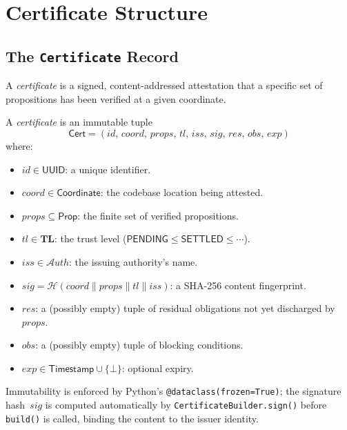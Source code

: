 \documentclass[11pt]{article}
\newcommand{\Cert}{\mathsf{Cert}}              %
\newcommand{\certid}{\mathit{id}}              %
\newcommand{\certcoord}{\mathit{coord}}        %
\newcommand{\certprops}{\mathit{props}}        %
\newcommand{\certtrust}{\mathit{tl}}           %
\newcommand{\certissuer}{\mathit{iss}}         %
\newcommand{\certsig}{\mathit{sig}}            %
\newcommand{\certresid}{\mathit{res}}          %
\newcommand{\certobstr}{\mathit{obs}}          %
\newcommand{\certexpiry}{\mathit{exp}}         %
\newcommand{\TL}{\mathbf{TL}}                  %
\newcommand{\Sigalg}{\mathcal{H}}              %
\newcommand{\Prop}{\mathsf{Prop}}              %
\newcommand{\AuthSet}{\mathcal{A}\!\mathit{uth}} %
\newcommand{\Pending}{\mathsf{PENDING}}
\newcommand{\Settled}{\mathsf{SETTLED}}
\begin{document}
\section{Certificate Structure}\label{sec:cert}

\subsection{The \texttt{Certificate} Record}

A \emph{certificate} is a signed, content-addressed attestation that a
specific set of propositions has been verified at a given coordinate.

\begin{definition}[Certificate]\label{def:cert}
A \emph{certificate} is an immutable tuple
\[
  \Cert = (\certid,\,\certcoord,\,\certprops,\,\certtrust,\,
           \certissuer,\,\certsig,\,\certresid,\,\certobstr,\,\certexpiry)
\]
where:
\begin{itemize}
  \item $\certid \in \mathsf{UUID}$: a unique identifier.
  \item $\certcoord \in \mathsf{Coordinate}$: the codebase location being attested.
  \item $\certprops \subseteq \Prop$: the finite set of verified propositions.
  \item $\certtrust \in \TL$: the trust level ($\Pending \le \Settled \le \cdots$).
  \item $\certissuer \in \AuthSet$: the issuing authority's name.
  \item $\certsig = \Sigalg(\certcoord \| \certprops \| \certtrust \| \certissuer)$:
        a SHA-256 content fingerprint.
  \item $\certresid$: a (possibly empty) tuple of residual obligations not yet
        discharged by $\certprops$.
  \item $\certobstr$: a (possibly empty) tuple of blocking conditions.
  \item $\certexpiry \in \mathsf{Timestamp} \cup \{\bot\}$: optional expiry.
\end{itemize}
\end{definition}

Immutability is enforced by Python's \texttt{@dataclass(frozen=True)};
the signature hash~$\certsig$ is computed automatically by
\texttt{CertificateBuilder.sign()} before \texttt{build()} is called,
binding the content to the issuer identity.
\end{document}
